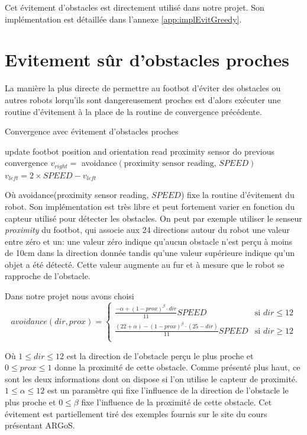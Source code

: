 Cet évitement d'obstacles est directement utilisé dans notre projet. Son implémentation est détaillée dans l'annexe \ref{app:implEvitGreedy}.

\section{Evitement sûr d'obstacles proches\label{sec:emerAvoid}}

La manière la plus directe de permettre au footbot d'éviter des obstacles ou autres robots lorqu'ils sont dangereusement proches est d'alors exécuter une routine d'évitement à la place de la routine de convergence précédente.
\begin{algorithm}
\label{obstacleConvergence}
\caption{Convergence avec évitement d'obstacles proches}
\begin{algorithmic}
    \STATE update footbot position and orientation
    \STATE read proximity sensor 
      \STATE do previous convergence
    \ELSE
      \STATE \( v_{right} = \) avoidance$(\text{proximity sensor reading, }SPEED)$
    \ENDIF
    \STATE \( v_{left} = 2 \times SPEED-v_{left}\)
  \ENDWHILE
\end{algorithmic}
\end{algorithm}

Où avoidance(proximity sensor reading, $SPEED$) fixe la routine d'évitement du robot. Son implémentation est très libre et peut fortement varier en fonction du capteur utilisé pour détecter les obstacles. On peut par exemple utiliser le senseur \emph{proximity} du footbot, qui associe aux 24 directions autour du robot une valeur entre zéro et un: une valeur zéro indique qu'aucun obstacle n'est perçu à moins de 10cm dans la direction donnée tandis qu'une valeur supérieure indique qu'un objet a été détecté. Cette valeur augmente au fur et à mesure que le robot se rapproche de l'obstacle.~\cite{argosSite1}

Dans notre projet nous avons choisi
\[avoidance(dir, prox)=
  \begin{cases}
      \frac{-\alpha +(1-prox)^{\beta}\cdot dir}{11}SPEED & \text{si }dir \leq 12\\
      \frac{(22+\alpha )-(1-prox)^{\beta}\cdot (25-dir)}{11}SPEED & \text{si }dir \geq 12\\
  \end{cases}
\]

Où $ 1 \leq dir \leq 12 $ est la direction de l'obstacle perçu le plus proche et \hbox{$0 \leq prox \leq 1$} donne la proximité de cette obstacle. Comme présenté plus haut, ce sont les deux informations dont on dispose si l'on utilise le capteur de proximité.  \(1 \leq \alpha \leq 12 \) est un paramètre qui fixe l'influence de la direction de l'obstacle le plus proche et \(0 \leq \beta \) fixe l'influence de la proximité de cette obstacle. Cet évitement est partiellement tiré des exemples fournis sur le site du cours présentant ARGoS.~\cite{argosSite1}


